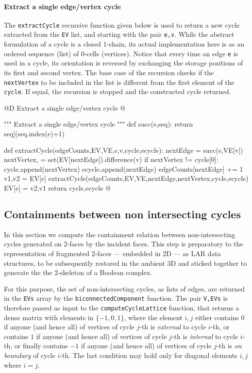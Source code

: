 \documentclass[11pt,oneside]{article}    %
\begin{document}
\paragraph{Extract a single edge/vertex cycle}
The \texttt{extractCycle} recursive function given below is used to return a new cycle extracted from the \texttt{EV} list, and starting with the pair \texttt{e,v}. While the abstract formulation of a cycle is a closed 1-chain, its actual implementation here is as an ordered sequence (list) of 0-cells (vertices). Notice that every time an edge \texttt{e} is used in a cycle, its orientation is reversed by exchanging the storage positions of its first and second vertex.  The base case of the recursion checks if the \texttt{nextVertex} to be included in the list is different from the first element of the \texttt{cycle}. If equal, the recursion is stopped and the constructed cycle returned.
 
@D Extract a single edge/vertex cycle
@{""" Extract a single edge/vertex cycle """ 
def succ(e,seq):
    return seq[(seq.index(e)+1) %
   
def extractCycle(edgeCounts,EV,VE,e,v,cycle,ecycle):        
    nextEdge = succ(e,VE[v])
    nextVertex, = set(EV[nextEdge]).difference({v})
    if nextVertex != cycle[0]:
        cycle.append(nextVertex)
        ecycle.append(nextEdge)
        edgeCounts[nextEdge] += 1 
        v1,v2 = EV[e]
        extractCycle(edgeCounts,EV,VE,nextEdge,nextVertex,cycle,ecycle)
        EV[e] = v2,v1
    return cycle,ecycle
@}
    


\subsection{Containments between non intersecting cycles}

In this section we compute the containment relation between non-intersecting cycles generated on 2-faces by the incident faces. This step is preparatory to the representation of fragmented 2-faces --- embedded in 2D --- as LAR data structures, to be subsequently restored in the ambient 3D and sticked together to generate the the 2-skeleton of a Boolean complex.

For this purpose, the set of non-intersecting cycles, as lists of edges, are returned in the \texttt{EVs} array by the \texttt{biconnectedComponent} function. The pair \texttt{V,EVs} is therefore passed as input to the \texttt{computeCycleLattice} function, that returns a dense matrix with elements in $\{-1,0,1\}$, where the element $i,j$ either contains $0$ if anyone (and hence all) of vertices of cycle $j$-th is \emph{external} to cycle $i$-th, or contains $1$ if anyone (and hence all) of vertices of cycle $j$-th is \emph{internal} to cycle $i$-th, or finally contains $-1$ if anyone (and hence all) of vertices of cycle $j$-th is \emph{on boundary} of cycle $i$-th. The last condition may hold only for diagonal elements $i,j$ where $i=j$.
\end{document}

